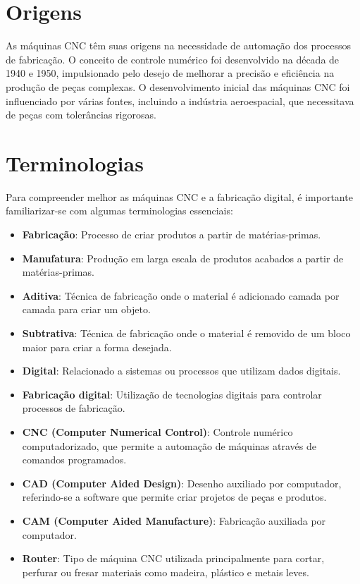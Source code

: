 \documentclass[
]{book}
\providecommand{\tightlist}{%
  \setlength{\itemsep}{0pt}\setlength{\parskip}{0pt}}
\begin{document}
\section{Origens}\label{origens}

As máquinas CNC têm suas origens na necessidade de automação dos processos de fabricação. O conceito de controle numérico foi desenvolvido na década de 1940 e 1950, impulsionado pelo desejo de melhorar a precisão e eficiência na produção de peças complexas. O desenvolvimento inicial das máquinas CNC foi influenciado por várias fontes, incluindo a indústria aeroespacial, que necessitava de peças com tolerâncias rigorosas.

\section{Terminologias}\label{terminologias}

Para compreender melhor as máquinas CNC e a fabricação digital, é importante familiarizar-se com algumas terminologias essenciais:

\begin{itemize}
\tightlist
\item
  \textbf{Fabricação}: Processo de criar produtos a partir de matérias-primas.
\item
  \textbf{Manufatura}: Produção em larga escala de produtos acabados a partir de matérias-primas.
\item
  \textbf{Aditiva}: Técnica de fabricação onde o material é adicionado camada por camada para criar um objeto.
\item
  \textbf{Subtrativa}: Técnica de fabricação onde o material é removido de um bloco maior para criar a forma desejada.
\item
  \textbf{Digital}: Relacionado a sistemas ou processos que utilizam dados digitais.
\item
  \textbf{Fabricação digital}: Utilização de tecnologias digitais para controlar processos de fabricação.
\item
  \textbf{CNC (Computer Numerical Control)}: Controle numérico computadorizado, que permite a automação de máquinas através de comandos programados.
\item
  \textbf{CAD (Computer Aided Design)}: Desenho auxiliado por computador, referindo-se a software que permite criar projetos de peças e produtos.
\item
  \textbf{CAM (Computer Aided Manufacture)}: Fabricação auxiliada por computador.
\item
  \textbf{Router}: Tipo de máquina CNC utilizada principalmente para cortar, perfurar ou fresar materiais como madeira, plástico e metais leves.
\end{itemize}
\end{document}
